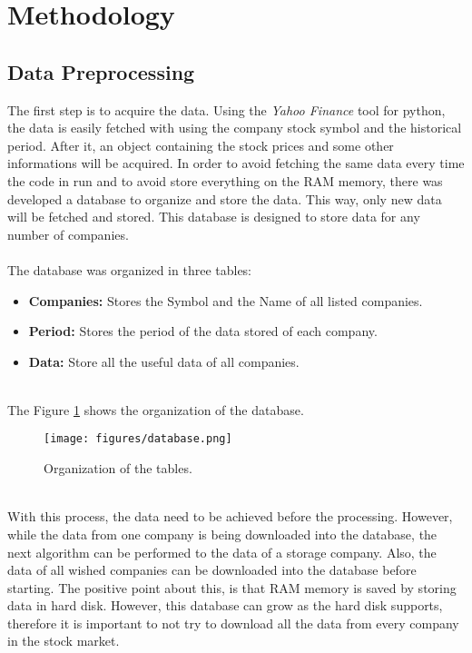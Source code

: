 \section{Methodology}
\label{sec:methodology}

\subsection{Data Preprocessing}
The first step is to acquire the data. Using the \textit{Yahoo Finance} tool for python, the data is easily fetched with using the company stock symbol and the historical period. After
it, an object containing the stock prices and some other informations will be acquired. In order to avoid fetching the same data every time the code in run and to avoid store everything 
on the RAM memory, there was developed a database to organize and store the data. This way, only new data will be fetched and stored. This database is designed to store data for any number
of companies.\\
\\
The database was organized in three tables:
\begin{itemize}
 \item \textbf{Companies:} Stores the Symbol and the Name of all listed companies.\\
 \item \textbf{Period:} Stores the period of the data stored of each company.\\
 \item \textbf{Data:} Store all the useful data of all companies.\\
\end{itemize}
\ \\
The Figure \ref{fig:db} shows the organization of the database.
\\
\begin{figure}[H]
\centering
\texttt{[image: figures/database.png]}
\caption{Organization of the tables.}
\label{fig:db}
\end{figure}
\ \\
With this process, the data need to be achieved before the processing. However, while the data from one company is being downloaded into the database, the next algorithm can be performed
to the data of a storage company. Also, the data of all wished companies can be downloaded into the database before starting. The positive point about this, is that RAM memory is saved
by storing data in hard disk. However, this database can grow as the hard disk supports, therefore it is important to not try to download all the data from every company in the stock market.
